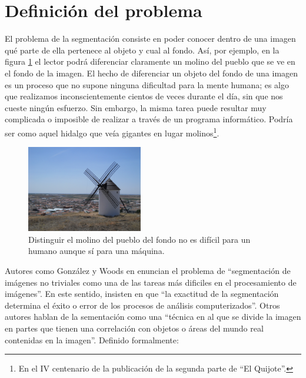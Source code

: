 \section{Definición del problema}\label{sec:definicion}
El problema de la segmentación consiste en poder conocer dentro de una imagen qué parte de ella pertenece al objeto y cual al fondo. Así, por ejemplo, en la figura \ref{img:ejemplomolino} el lector podrá diferenciar claramente un molino del pueblo que se ve en el fondo de la imagen. El hecho de diferenciar un objeto del fondo de una imagen es un proceso que no supone ninguna dificultad para la mente humana; es algo que realizamos inconscientemente cientos de veces durante el día, sin que nos cueste ningún esfuerzo. Sin embargo, la misma tarea puede resultar muy complicada o imposible de realizar a través de un programa informático. Podría ser como aquel hidalgo que veía gigantes en lugar molinos\footnote{En el IV centenario de la publicación de la segunda parte de ``El Quijote''.}.

\begin{figure}
	\centering
	\includegraphics[width=0.45\textwidth]{img/molino.jpg}
	\caption{Distinguir el molino del pueblo del fondo no es difícil para un humano aunque sí para una máquina.}
	\label{img:ejemplomolino}
\end{figure}

 Autores como González y Woods en \cite{lib:gonzalez} enuncian el problema de ``segmentación de imágenes no triviales como una de las tareas más dificiles en el procesamiento de imágenes''. En este sentido, insisten en que ``la exactitud de la segmentación determina el éxito o error de los procesos de análisis computerizados''. Otros autores \cite{lib:sonka} hablan de la sementación como una ``técnica en al que se divide la imagen en partes que tienen una correlación con objetos o áreas del mundo real contenidas en la imagen''. Definido formalmente:

